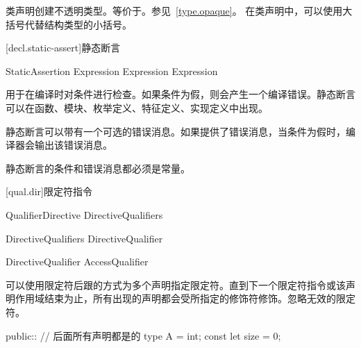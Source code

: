 \pnum
类声明创建不透明类型。等价于。参见~\ref{type.opaque}。
在类声明中，可以使用大括号代替结构类型的小括号。

[decl.static-assert]{静态断言}

\begin{bnf}{StaticAssertion}
      Expression \terminal{;} \br
      Expression \terminal{:} Expression \terminal{;}
\end{bnf}

\pnum
{}用于在编译时对条件进行检查。如果条件为假，则会产生一个编译错误。静态断言可以在函数、模块、枚举定义、特征定义、实现定义中出现。

\pnum
静态断言可以带有一个可选的错误消息。如果提供了错误消息，当条件为假时，编译器会输出该错误消息。

\pnum
静态断言的条件和错误消息都必须是常量。

[qual.dir]{限定符指令}

\begin{bnf}{QualifierDirective}
    DirectiveQualifiers \terminal{::}
\end{bnf}

\begin{bnf}{DirectiveQualifiers}
    DirectiveQualifier\bnfp
\end{bnf}

\begin{bnf}{DirectiveQualifier}
    AccessQualifier
\end{bnf}

\pnum
可以使用限定符后跟\tcode{::}的方式为多个声明指定限定符。直到下一个限定符指令或该声明作用域结束为止，所有出现的声明都会受所指定的修饰符修饰。忽略无效的限定符。

\enterexample
\begin{codeblock}
public:: // 后面所有声明都是的
type A = int;
const let size = 0;
\end{codeblock}